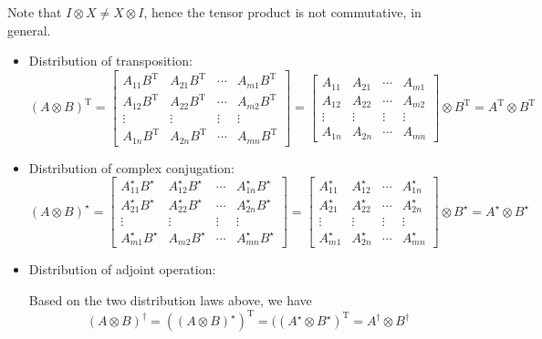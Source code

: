 \documentclass{homeworg}
\begin{document}
Note that $I\otimes X\neq X\otimes I$, hence the tensor product is not commutative, in general.
\exercise*
\begin{itemize}
    \item Distribution of transposition:
    \[(A\otimes B)^\text{T}=\begin{bmatrix}
    A_{11}B^\text{T} & A_{21}B^\text{T} & \cdots & A_{m1}B^\text{T}\\
    A_{12}B^\text{T} & A_{22}B^\text{T} & \cdots & A_{m2}B^\text{T}\\
    \vdots & \vdots & \vdots & \vdots\\
    A_{1n}B^\text{T} & A_{2n}B^\text{T} & \cdots & A_{mn}B^\text{T}
    \end{bmatrix}
    =\begin{bmatrix}
    A_{11} & A_{21} & \cdots & A_{m1}\\
    A_{12} & A_{22} & \cdots & A_{m2}\\
    \vdots & \vdots & \vdots & \vdots\\
    A_{1n} & A_{2n} & \cdots & A_{mn}
    \end{bmatrix}\otimes B^\text{T}=A^\text{T}\otimes B^\text{T}\]
    
    \item Distribution of complex conjugation:
    \[(A\otimes B)^\star=\begin{bmatrix}
    A_{11}^\star B^\star & A_{12}^\star B^\star & \cdots & A_{1n}^\star B^\star\\
    A_{21}^\star B^\star & A_{22}^\star B^\star & \cdots & A_{2n}^\star B^\star\\
    \vdots & \vdots & \vdots & \vdots\\
    A_{m1}^\star B^\star & A_{m2}B^\star & \cdots & A_{mn}^\star B^\star
    \end{bmatrix}
    =\begin{bmatrix}
    A_{11}^\star & A_{12}^\star & \cdots & A_{1n}^\star\\
    A_{21}^\star & A_{22}^\star & \cdots & A_{2n}^\star\\
    \vdots & \vdots & \vdots & \vdots\\
    A_{m1}^\star & A_{2n}^\star & \cdots & A_{mn}^\star
    \end{bmatrix}\otimes B^\star=A^\star\otimes B^\star\]
    
    \item Distribution of adjoint operation:
    
    Based on the two distribution laws above, we have
    \[(A\otimes B)^\dagger=((A\otimes B)^\star)^\text{T}=((A^\star\otimes B^\star)^\text{T}=A^\dagger\otimes B^\dagger\]
\end{itemize}
\end{document}
